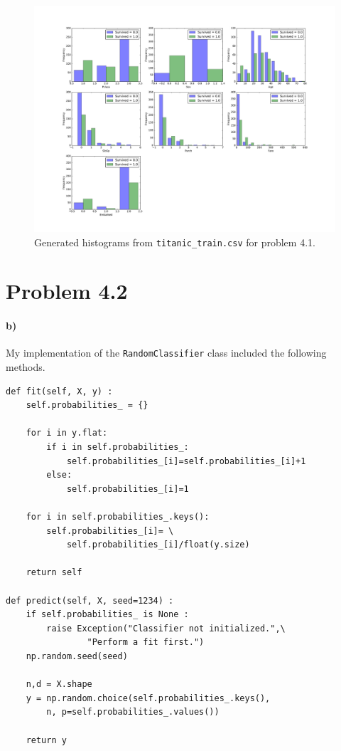 \documentclass[12pt]{article}
\begin{document}
\begin{figure}[H]
        \begin{adjustwidth}{-10in}{-10in}
                \begin{center}
                        \includegraphics[width=8.5in,height=\textheight,keepaspectratio]{histograms}
                        \caption{Generated histograms from \texttt{titanic\_train.csv} for problem 4.1.}
                \end{center}
        \end{adjustwidth}
\end{figure}

\section*{Problem 4.2}

\paragraph{b)}

My implementation of the \texttt{RandomClassifier} class included the following methods.

\begin{verbatim}
def fit(self, X, y) :
    self.probabilities_ = {}

    for i in y.flat:
        if i in self.probabilities_:
            self.probabilities_[i]=self.probabilities_[i]+1
        else:
            self.probabilities_[i]=1

    for i in self.probabilities_.keys():
        self.probabilities_[i]= \
            self.probabilities_[i]/float(y.size)

    return self

def predict(self, X, seed=1234) :
    if self.probabilities_ is None :
        raise Exception("Classifier not initialized.",\
                "Perform a fit first.")
    np.random.seed(seed)

    n,d = X.shape
    y = np.random.choice(self.probabilities_.keys(),
        n, p=self.probabilities_.values())

    return y
\end{verbatim}
\end{document}
